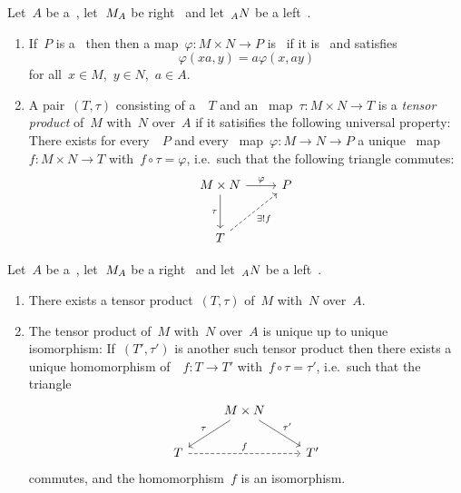 \begin{definition}
  Let~$A$ be a~{\kalg}, let~$\indmodule{M}[A]$ be right~{} and let~$\indmodule[A]{N}$ be a left~{}.
  \begin{enumerate}
    \item
      If~$P$ is a~{\module{$\kf$}} then then a map~$\varphi \colon M \times N \to P$ is~\emph{} if it is~{\kbilin} and satisfies
      \[
          \varphi(xa, y)
        = a\varphi(x, ay)
      \]
      for all~$x \in M$,~$y \in N$,~$a \in A$.
    \item
      A pair~$(T,\tau)$ consisting of a~{\module{$\kf$}}~$T$ and an~{} map~$\tau \colon M \times N \to T$ is a \emph{tensor product} of~$M$ with~$N$ over~$A$ if it satisifies the following universal property:
      There exists for every~{\module{$\kf$}}~$P$ and every~{} map~$\varphi \colon M \to N \to P$ a unique~{\klin} map~$f \colon M \times N \to T$ with~$f \circ \tau = \varphi$, i.e.\ such that the following triangle commutes:
      \[
        \begin{tikzcd}[row sep = large]
            M \times N
            \arrow{r}[above]{\varphi}
            \arrow{d}[left]{\tau}
          & P
          \\
            T
            \arrow[dashed]{ur}[below right]{\exists! f}
          & {}
        \end{tikzcd}
      \]
  \end{enumerate}
\end{definition}


\begin{lemma}

Let~$A$ be a~{\kalg}, let~$\indmodule{M}[A]$ be a right~{} and let~$\indmodule[A]{N}$ be a left~{}.
  \begin{enumerate}
    \item
      There exists a tensor product~$(T,\tau)$ of~$M$ with~$N$ over~$A$.
    \item
      The tensor product of~$M$ with~$N$ over~$A$ is unique up to unique isomorphism:
      If~$(T',\tau')$ is another such tensor product then there exists a unique homomorphism of~{\modules{$\kf$}}~$f \colon T \to T'$ with~$f \circ \tau = \tau'$, i.e.\ such that the triangle
      \[
        \begin{tikzcd}
            {}
          & M \times N
            \arrow{dl}[above left]{\tau}
            \arrow{dr}[above right]{\tau'}
          & {}
          \\
            T
            \arrow[dashed]{rr}[above]{f}
          & {}
          & T'
        \end{tikzcd}
      \]
      commutes, and the homomorphism~$f$ is an isomorphism.
  \end{enumerate}
\end{lemma}


